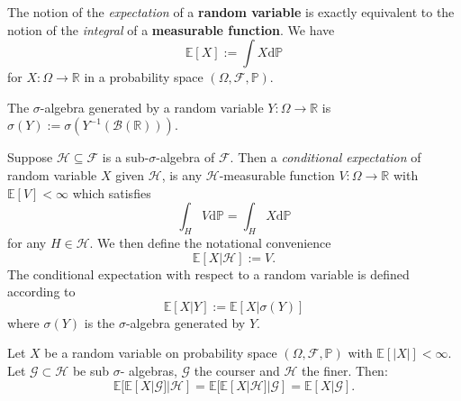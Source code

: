 \begin{definition}[Expectation]
    The notion of the \emph{expectation} of a \textbf{random variable} is exactly equivalent
    to the notion of the \emph{integral} of a \textbf{measurable function}.
    We have
    \begin{equation*}
        \mathbb{E}[X]:=\int X\mathrm d\mathbb{P}
    \end{equation*}
    for $X:\Omega\rightarrow\mathbb{R}$ in a probability space $(\Omega,\mathcal{F},\mathbb{P})$.
\end{definition}

\begin{definition}
    The $\sigma$-algebra generated by a random variable $Y:\Omega\rightarrow\mathbb{R}$
    is $\sigma(Y):=\sigma(Y^{-1}(\mathcal{B}(\mathbb{R})))$.
\end{definition}

\begin{definition}
    Suppose $\mathcal{H}\subseteq\mathcal{F}$ is a sub-$\sigma$-algebra
    of $\mathcal{F}.$ Then a \emph{conditional expectation} of random variable
    $X$ given $\mathcal{H}$, is any $\mathcal{H}$-measurable function 
    $V:\Omega\rightarrow\mathbb{R}$ with $\mathbb{E}[V]<\infty$ which satisfies
    \begin{equation*}
        \int_H V\mathrm d\mathbb{P}=\int_H X\mathrm d\mathbb{P}
    \end{equation*}
    for any $H\in\mathcal{H}$. We then define the notational convenience
    \begin{equation*}
        \mathbb{E}[X|\mathcal{H}]:=V.
    \end{equation*}
    The conditional expectation with respect to a random variable is defined according
    to
    \begin{equation*}
        \mathbb{E}[X|Y]:=\mathbb{E}[X|\sigma(Y)]
    \end{equation*}
    where $\sigma(Y)$ is the $\sigma$-algebra generated by $Y$.
\end{definition}

\begin{theorem}
    Let $X$ be a random variable on probability space $(\Omega,\mathcal{F},\mathbb{P})$
    with $\mathbb{E}[|X|]<\infty$. Let $\mathcal{G}\subset\mathcal{H}$ be sub $\sigma$-
    algebras, $\mathcal{G}$ the courser and $\mathcal{H}$ the finer. Then:
    \begin{equation*}
        \mathbb{E}[\mathbb{E}[X|\mathcal{G}]|\mathcal{H}]=\mathbb{E}[\mathbb{E}[X|\mathcal{H}]|\mathcal{G}]=\mathbb{E}[X|\mathcal{G}].
    \end{equation*}
\end{theorem}

